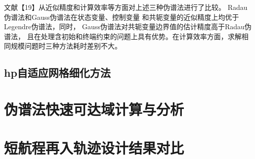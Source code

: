 文献【19】从近似精度和计算效率等方面对上述三种伪谱法进行了比较。 Radau伪谱法和Gauss伪谱法在状态变量、控制变量
和共轭变量的近似精度上均优于 Legendre伪谱法，同时， Gauss伪谱法对共轭变量边界值的估计精度高于Radau伪谱法，
且在处理含初始和终端约束的问题上具有优势。在计算效率方面，求解相同规模问题时三种方法耗时差别不大。
\subsection{hp自适应网格细化方法}


\section{伪谱法快速可达域计算与分析}
\section{短航程再入轨迹设计结果对比}

\subsection{}